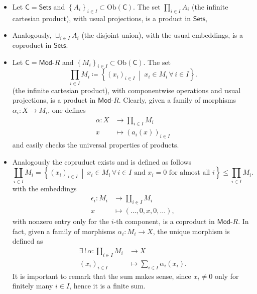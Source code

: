 \begin{ex}\leavevmode\vspace{-.2\baselineskip}
	\begin{itemize}
		\item Let $\mathsf{C} = \mathsf{Sets}$ and $\left\{ A_i \right\}_{i \in I} \subset \mathrm{Ob} \left(\mathsf{C}\right)$.
			The set $\prod_{i \in I} A_i$ (the infinite cartesian product), with usual projections, is a product in $\mathsf{Sets}$,
		\item Analogously, $\sqcup_{i \in I} A_i$ (the disjoint union), with the usual embeddings, is a coproduct in $\mathsf{Sets}$.
		\item Let $\mathsf{C} = \mathsf{Mod}\text{-}R$ and $\left\{ M_i \right\}_{i \in I} \subset \mathrm{Ob} \left(\mathsf{C}\right)$.
			The set 
			\begin{equation}
			\prod_{i \in I} M_i \coloneqq \left\{ \left( x_i \right)_{i \in I} \ \middle|\ x_i \in M_i \,\forall\, i \in I \right\}	
			.\end{equation}
			(the infinite cartesian product), with componentwise operations and usual projections, is a product in $\mathsf{Mod}\text{-}R$.
			Clearly, given a family of morphisms $\alpha_i\colon X \to M_i$, one defines
			\begin{align}
				\alpha\colon X &\to \prod_{i \in I} M_i \\
				x &\mapsto \left( a_i(x) \right)_{i \in I}
			\end{align} 
			and easily checks the universal properties of products.
		\item Analogously the copruduct exists and is defined as follows
			\begin{equation}
				\coprod_{i \in I} M_i = \left\{ \left( x_i \right)_{i \in I} \ \middle|\ x_i \in M_i \,\forall\, i \in I \text{ and } x_i = 0  \text{ for almost all } i  \right\} \leq \prod_{i \in I} M_i
			.\end{equation} 
			with the embeddings
			\begin{align}
				\epsilon_i\colon M_i &\to \coprod_{i \in I} M_i \\
				x &\mapsto \left( \ldots, 0, x, 0, \ldots \right)
			,\end{align} 
			with nonzero entry only for the $i$-th component, is a coproduct in $\mathsf{Mod}\text{-}R$.
			In fact, given a family of morphisms $\alpha_i\colon M_i \to X$, the unique morphism is defined as
			\begin{align}
				\exists\, !\, \alpha\colon \coprod_{i \in I}M_i &\to X \\
				\left( x_i \right)_{i\in I} &\mapsto \sum_{i \in I}^{} \alpha_i(x_i)
			.\end{align} 
			It is important to remark that the sum makes sense, since $x_i \neq 0$ only for finitely many $i \in I$, hence it is a finite sum.
	\end{itemize}
\end{ex} 

